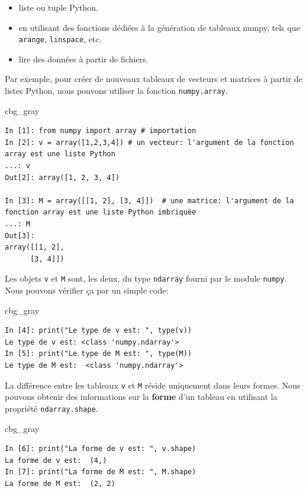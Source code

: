 \documentclass[%
oneside,                 %
final,                   %
10pt,french]{article}
\newenvironment{_cod_tight}[1]{
   \def\FrameCommand{\colorbox{#1}}
   \FrameRule0.6pt\MakeFramed {\FrameRestore}\vskip3mm}
   {\vskip0mm\endMakeFramed}
\newenvironment{cod}[1]{
\bgroup\rmfamily
\fboxsep=0mm\relax
\begin{_cod_tight}{#1}
\list{}{\parsep=-2mm\parskip=0mm\topsep=0pt\leftmargin=2mm
\rightmargin=2\leftmargin\leftmargin=4pt\relax}
\item\relax}
{\endlist\end{_cod_tight}\egroup}
\begin{document}
\begin{itemize}
\item liste ou tuple Python.

\item en utilisant des fonctions dédiées à la génération de tableaux numpy, tels que \texttt{arange}, \texttt{linspace}, etc.

\item lire des données à partir de fichiers.
\end{itemize}

\noindent
Par exemple, pour créer de nouveaux tableaux de vecteurs et matrices à partir de listes Python, nous pouvons utiliser la fonction \texttt{numpy.array}.

\begin{cod}{cbg_gray}\begin{verbatim}
In [1]: from numpy import array # importation
In [2]: v = array([1,2,3,4]) # un vecteur: l'argument de la fonction array est une liste Python
...: v
Out[2]: array([1, 2, 3, 4])

In [3]: M = array([[1, 2], [3, 4]])  # une matrice: l'argument de la fonction array est une liste Python imbriquée
...: M
Out[3]:
array([[1, 2],
      [3, 4]])
\end{verbatim}
\end{cod}
\noindent

Les objets \texttt{v} et \texttt{M} sont, les deux, du type \texttt{ndarray} fourni par le module \texttt{numpy}.
Nous pouvons vérifier ça par un simple code:

\begin{cod}{cbg_gray}\begin{verbatim}
In [4]: print("Le type de v est: ", type(v))
Le type de v est: <class 'numpy.ndarray'>
In [5]: print("Le type de M est: ", type(M))
Le type de M est:  <class 'numpy.ndarray'>
\end{verbatim}
\end{cod}
\noindent

La différence entre les tableaux \texttt{v} et \texttt{M} réside uniquement dans leurs formes. Nous pouvons obtenir des informations sur la \textbf{forme} d'un tableau en utilisant la propriété \texttt{ndarray.shape}.
\begin{cod}{cbg_gray}\begin{verbatim}
In [6]: print("La forme de v est: ", v.shape)
La forme de v est:  (4,)
In [7]: print("La forme de M est: ", M.shape)
La forme de M est:  (2, 2)
\end{verbatim}
\end{cod}
\noindent
\end{document}
